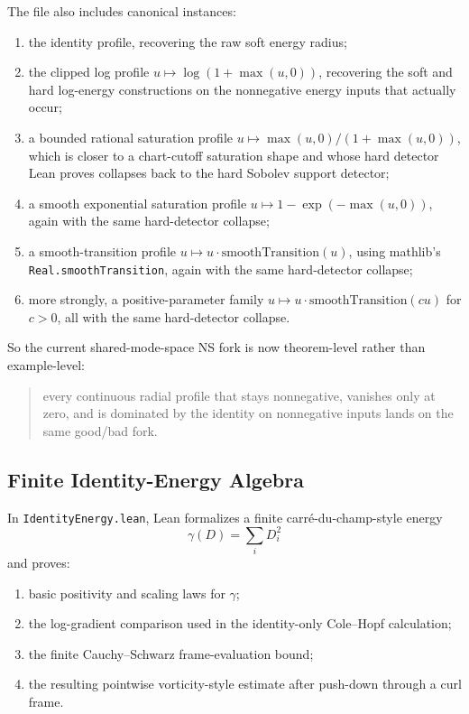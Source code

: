 \documentclass[11pt]{article}
\begin{document}
The file also includes canonical instances:
\begin{enumerate}[leftmargin=1.5em]
  \item the identity profile, recovering the raw soft energy radius;
  \item the clipped log profile \(u \mapsto \log(1+\max(u,0))\), recovering the
  soft and hard log-energy constructions on the nonnegative energy inputs that
  actually occur;
  \item a bounded rational saturation profile
  \(u \mapsto \max(u,0)/(1+\max(u,0))\), which is closer to a chart-cutoff
  saturation shape and whose hard detector Lean proves collapses back to the
  hard Sobolev support detector;
  \item a smooth exponential saturation profile
  \(u \mapsto 1-\exp(-\max(u,0))\), again with the same hard-detector collapse;
  \item a smooth-transition profile
  \(u \mapsto u \cdot \mathrm{smoothTransition}(u)\), using mathlib's
  \texttt{Real.smoothTransition}, again with the same hard-detector collapse;
  \item more strongly, a positive-parameter family
  \(u \mapsto u \cdot \mathrm{smoothTransition}(cu)\) for \(c>0\), all with the
  same hard-detector collapse.
\end{enumerate}

So the current shared-mode-space NS fork is now theorem-level rather than
example-level:
\begin{quote}
every continuous radial profile that stays nonnegative, vanishes only at zero,
and is dominated by the identity on nonnegative inputs lands on the same
good/bad fork.
\end{quote}

\subsection{Finite Identity-Energy Algebra}

In \texttt{IdentityEnergy.lean}, Lean formalizes a finite
carr\'e-du-champ-style energy
\[
\gamma(D) = \sum_i D_i^2
\]
and proves:
\begin{enumerate}[leftmargin=1.5em]
  \item basic positivity and scaling laws for \(\gamma\);
  \item the log-gradient comparison used in the identity-only
  Cole--Hopf calculation;
  \item the finite Cauchy--Schwarz frame-evaluation bound;
  \item the resulting pointwise vorticity-style estimate after push-down
  through a curl frame.
\end{enumerate}
\end{document}
